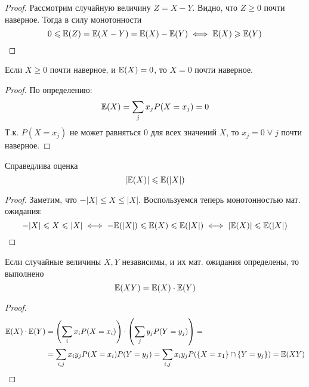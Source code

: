 \begin{proof}
    Рассмотрим случайную величину $Z = X - Y$. Видно, что $Z \geq 0$ почти наверное. Тогда в силу монотонности
    \[
        0 \leqslant \mathbb{E}(Z) = \mathbb{E}(X - Y) = \mathbb{E}(X) - \mathbb{E}(Y) \iff \mathbb{E}(X) \geqslant \mathbb{E}(Y)
    \]
\end{proof}
\begin{proposal}
    Если $X \geq 0$ почти наверное, и $\mathbb{E}(X) = 0$, то $X = 0$ почти наверное.
\end{proposal}
\begin{proof}
    По определению:
    \[
        \mathbb{E}(X) = \sum\limits_{j} x_j P(X = x_j) = 0
    \]
    Т.к. $P(X = x_j)$ не может равняться $0$ для всех значений $X$, то $x_j = 0\;\forall\; j$ почти наверное.
\end{proof}
\begin{proposal}
    Справедлива оценка
    \[
        |\mathbb{E}(X)| \leqslant \mathbb{E}(|X|)
    \]
\end{proposal}
\begin{proof}
    Заметим, что $-|X| \leq X \leq |X|$. Воспользуемся теперь монотонностью мат. ожидания:
    \[
        -|X| \leqslant X \leqslant |X| \iff -\mathbb{E}(|X|) \leqslant \mathbb{E}(X) \leqslant \mathbb{E}(|X|) \iff |\mathbb{E}(X)| \leqslant \mathbb{E}(|X|)
    \]
\end{proof}
\begin{proposal}
    Если случайные величины $X, Y$ независимы, и их мат. ожидания определены, то выполнено
    \[
        \mathbb{E}(XY) = \mathbb{E}(X) \cdot \mathbb{E}(Y)
    \]
\end{proposal}
\begin{proof}
    \begin{align*}
        \mathbb{E}(X) \cdot \mathbb{E}(Y) &= \left( \sum\limits_{i} x_i P(X = x_i) \right) \cdot
        \left( \sum\limits_{j} y_j P(Y = y_j) \right) =\\
        &=\sum\limits_{i, j} x_{i}y_j P(X = x_i)P(Y = y_j) =
        \sum\limits_{i, j} x_i y_j P(\{X = x_1\} \cap \{Y = y_j\}) = \mathbb{E}(XY)
    \end{align*}
\end{proof}
\begin{comment}
    Второй переход справедлив в силу абсолютной сходимости рядов. Четвёртый переход справедлив в силу
    независимости $X, Y$.
\end{comment}

